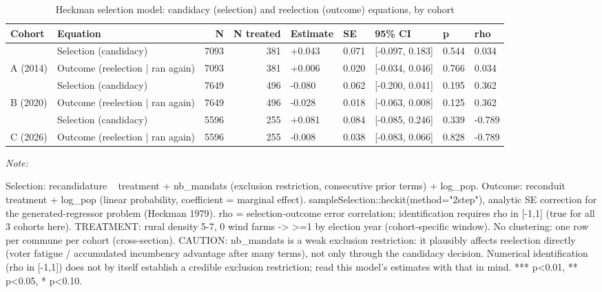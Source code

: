 \begin{table}[!h]
\centering
\caption{\label{tab:table_heckman_simple}Heckman selection model: candidacy (selection) and reelection (outcome) equations, by cohort}
\centering
\fontsize{9}{11}\selectfont
\begin{threeparttable}
\begin{tabular}[t]{llrrlllll}
\toprule
Cohort & Equation & N & N treated & Estimate & SE & 95\% CI & p & rho\\
\midrule
 & Selection (candidacy) & 7093 & 381 & +0.043 & 0.071 & {}[-0.097, 0.183] & 0.544 & 0.034\\
\cmidrule{2-9}
\multirow[t]{-2}{*}{\raggedright\arraybackslash A (2014)} & Outcome (reelection | ran again) & 7093 & 381 & +0.006 & 0.020 & {}[-0.034, 0.046] & 0.766 & 0.034\\
\cmidrule{1-9}
 & Selection (candidacy) & 7649 & 496 & -0.080 & 0.062 & {}[-0.200, 0.041] & 0.195 & 0.362\\
\cmidrule{2-9}
\multirow[t]{-2}{*}{\raggedright\arraybackslash B (2020)} & Outcome (reelection | ran again) & 7649 & 496 & -0.028 & 0.018 & {}[-0.063, 0.008] & 0.125 & 0.362\\
\cmidrule{1-9}
 & Selection (candidacy) & 5596 & 255 & +0.081 & 0.084 & {}[-0.085, 0.246] & 0.339 & -0.789\\
\cmidrule{2-9}
\multirow[t]{-2}{*}{\raggedright\arraybackslash C (2026)} & Outcome (reelection | ran again) & 5596 & 255 & -0.008 & 0.038 & {}[-0.083, 0.066] & 0.828 & -0.789\\
\bottomrule
\end{tabular}
\begin{tablenotes}
\item \textit{Note: } 
\item Selection: recandidature ~ treatment + nb_mandats (exclusion restriction, consecutive prior terms) + log_pop. Outcome: reconduit ~ treatment + log_pop (linear probability, coefficient = marginal effect). sampleSelection::heckit(method="2step"), analytic SE correction for the generated-regressor problem (Heckman 1979). rho = selection-outcome error correlation; identification requires rho in [-1,1] (true for all 3 cohorts here). TREATMENT: rural density 5-7, 0 wind farms -> >=1 by election year (cohort-specific window). No clustering: one row per commune per cohort (cross-section). CAUTION: nb_mandats is a weak exclusion restriction: it plausibly affects reelection directly (voter fatigue / accumulated incumbency advantage after many terms), not only through the candidacy decision. Numerical identification (rho in [-1,1]) does not by itself establish a credible exclusion restriction; read this model's estimates with that in mind. *** p<0.01, ** p<0.05, * p<0.10.
\end{tablenotes}
\end{threeparttable}
\end{table}
